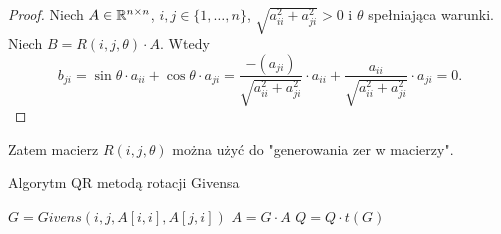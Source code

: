 \documentclass[12pt,a4paper]{report}
\newcommand{\mx}[1]{{#1}}
\begin{document}
\begin{proof}
Niech $\mx{A} \in \setR^{n \times n}$, $i,j \in \{1,\ldots,n\}$, $\sqrt{a_{ii}^{2} + a_{ji}^{2}} > 0$ i $\theta$ spełniająca warunki. Niech $\mx{B} = \mx{R}(i,j,\theta)\cdot \mx{A}$. Wtedy 
$$
b_{ji}= \sin\theta\cdot a_{ii} + \cos\theta\cdot a_{ji} = \frac{-(a_{ji})}{\sqrt{a_{ii}^{2} + a_{ji}^{2}}} \cdot a_{ii} + \frac{a_{ii}}{\sqrt{a_{ii}^{2} + a_{ji}^{2}}} \cdot a_{ji} = 0.
$$
\end{proof}
Zatem macierz $\mx{R}(i,j,\theta)$ można użyć do "generowania zer w macierzy".
\begin{algorithm}
\caption{Algorytm QR metodą rotacji Givensa}
\begin{algorithmic}
		\State $\mx{G} = Givens(i,j, \mx{A}[i,i], \mx{A}[j,i])$
		\State $\mx{A} = \mx{G}\cdot \mx{A}$
      	\State $\mx{Q} = \mx{Q}\cdot \mx{t(G)}$
      	
	\EndFor	
\EndFor
\end{algorithmic}
\end{algorithm}
\end{document}
